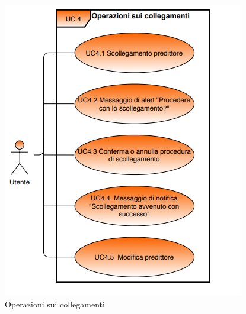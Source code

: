 		\begin{figure}[H]
		\centering
		\includegraphics[scale=0.80]{../Analisi_dei_requisiti/img/Diagrammi_UML/UC4_Operazioni_sui_collegamenti.png}
		\caption{Operazioni sui collegamenti}
		\end{figure}	

